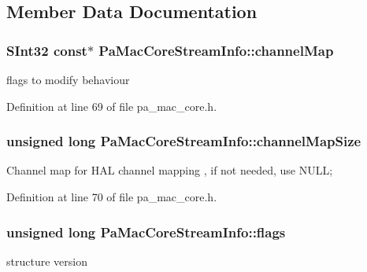 \subsection{Member Data Documentation}
\subsubsection[{\texorpdfstring{channel\+Map}{channelMap}}]{\setlength{\rightskip}{0pt plus 5cm}S\+Int32 {\bf const}$\ast$ Pa\+Mac\+Core\+Stream\+Info\+::channel\+Map}\hypertarget{struct_pa_mac_core_stream_info_a2339c27ad6b84924be79bf73e4402bd4}{}\label{struct_pa_mac_core_stream_info_a2339c27ad6b84924be79bf73e4402bd4}
flags to modify behaviour 

Definition at line 69 of file pa\+\_\+mac\+\_\+core.\+h.

\subsubsection[{\texorpdfstring{channel\+Map\+Size}{channelMapSize}}]{\setlength{\rightskip}{0pt plus 5cm}unsigned long Pa\+Mac\+Core\+Stream\+Info\+::channel\+Map\+Size}\hypertarget{struct_pa_mac_core_stream_info_aab3ecc35ef267ecebc8874d399061b87}{}\label{struct_pa_mac_core_stream_info_aab3ecc35ef267ecebc8874d399061b87}
Channel map for H\+AL channel mapping , if not needed, use N\+U\+LL; 

Definition at line 70 of file pa\+\_\+mac\+\_\+core.\+h.

\subsubsection[{\texorpdfstring{flags}{flags}}]{\setlength{\rightskip}{0pt plus 5cm}unsigned long Pa\+Mac\+Core\+Stream\+Info\+::flags}\hypertarget{struct_pa_mac_core_stream_info_afe018712e7c57198176ed72cb18f9938}{}\label{struct_pa_mac_core_stream_info_afe018712e7c57198176ed72cb18f9938}
structure version 

